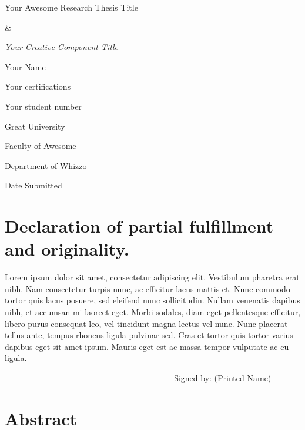 \documentclass[a4paper]{memoir}
\begin{document}
\frontmatter


\vspace*{2.5cm}
\begin{center}
    \huge{Your Awesome Research Thesis Title}

    \huge{\&}

    \emph{\huge{Your Creative Component Title}}


\vspace{2.5cm}
    \Large{Your Name}

    \normalsize{Your certifications}

    Your student number

\vspace{2cm}
    \Large{Great University}

    \normalsize{Faculty of Awesome}

    Department of Whizzo

    Date Submitted


\end{center}


\pagebreak


\chapter*{Declaration of partial fulfillment and originality.}
\label{declarationofpartialfulfillmentandoriginality.}

Lorem ipsum dolor sit amet, consectetur adipiscing elit. Vestibulum pharetra erat nibh. Nam consectetur turpis nunc, ac efficitur lacus mattis et. Nunc commodo tortor quis lacus posuere, sed eleifend nunc sollicitudin. Nullam venenatis dapibus nibh, et accumsan mi laoreet eget. Morbi sodales, diam eget pellentesque efficitur, libero purus consequat leo, vel tincidunt magna lectus vel nunc. Nunc placerat tellus ante, tempus rhoncus ligula pulvinar sed. Cras et tortor quis tortor varius dapibus eget sit amet ipsum. Mauris eget est ac massa tempor vulputate ac eu ligula. 

\_\_\_\_\_\_\_\_\_\_\_\_\_\_\_\_\_\_\_\_\_\_\_\_\_\_\_
Signed by: (Printed Name)

\chapter*{Abstract}
\label{abstract}
\end{document}
